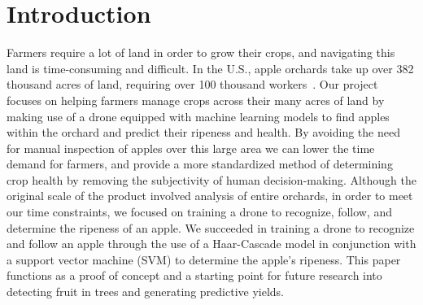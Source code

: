 \section{Introduction}\label{sec:introduction}
Farmers require a lot of land in order to grow their crops, and navigating this land
is time-consuming and difficult.
In the U.S., apple orchards take up over 382 thousand acres of land, requiring over
100 thousand workers~\cite{USApple}.
Our project focuses on helping farmers manage crops across their many acres of land
by making use of a drone equipped with machine learning models to
find apples within the orchard and predict their ripeness and health.
By avoiding the need for manual inspection of apples over this large area
we can lower the time demand for farmers, and provide a more standardized method of
determining crop health by removing the subjectivity of human decision-making.
Although the original scale of the product involved analysis of entire orchards, in
order to meet our time constraints, we focused on training a drone to recognize,
follow, and determine the ripeness of an apple.
We succeeded in training a drone to recognize and follow an apple through the use of
a Haar-Cascade model in conjunction with a support vector machine (SVM) to determine
the apple's ripeness.
This paper functions as a proof of concept and a starting point for future research
into detecting fruit in trees and generating predictive yields.
